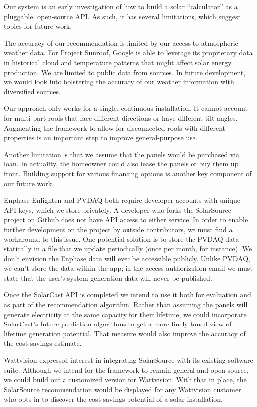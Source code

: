 \documentclass[pageno]{jpaper}
\begin{document}
Our system is an early investigation of how to build a solar ``calculator'' as a pluggable, open-source API. As such, it has several limitations, which suggest topics for future work.

The accuracy of our recommendation is limited by our access to atmospheric weather data. For Project Sunroof, Google is able to leverage its proprietary data in historical cloud and temperature patterns that might affect solar energy production. We are limited to public data from sources. In future development, we would look into bolstering the accuracy of our weather information with diversified sources.

Our approach only works for a single, continuous installation. It cannot account for multi-part roofs that face different directions or have different tilt angles. Augmenting the framework to allow for disconnected roofs with different properties is an important step to improve general-purpose use.

Another limitation is that we assume that the panels would be purchased via loan. In actuality, the homeowner could also lease the panels or buy them up front. Building support for various financing options is another key component of our future work.

Enphase Enlighten and PVDAQ both require developer accounts with unique API keys, which we store privately. A developer who forks the SolarSource project on Github does not have API access to either service. In order to enable further development on the project by outside contributors, we must find a workaround to this issue. One potential solution is to store the PVDAQ data statically in a file that we update periodically (once per month, for instance). We don't envision the Enphase data will ever be accessible publicly. Unlike PVDAQ, we can't store the data within the app; in the access authorization email we must state that the user's system generation data will never be published.

Once the SolarCast API is completed we intend to use it both for evaluation and as part of the recommendation algorithm. Rather than assuming the panels will generate electricity at the same capacity for their lifetime, we could incorporate SolarCast's future prediction algorithms to get a more finely-tuned view of lifetime generation potential. That measure would also improve the accuracy of the cost-savings estimate.

Wattvision expressed interest in integrating SolarSource with its existing software suite. Although we intend for the framework to remain general and open source, we could build out a customized version for Wattvision. With that in place, the SolarSource recommendation would be displayed for any Wattvision customer who opts in to discover the cost savings potential of a solar installation.
\end{document}

